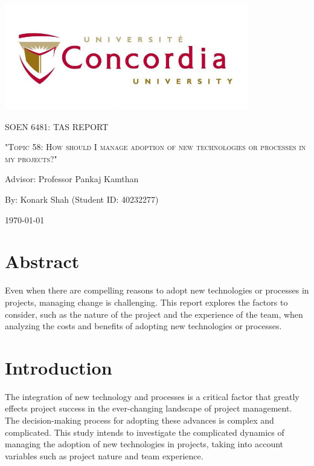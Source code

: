 \documentclass{article}
\begin{document}
\begin{titlepage}
    \centering
    \includegraphics[width=0.8\textwidth]{image.jpeg}\par %
     \vspace{2cm}
    {\scshape\Large SOEN 6481: TAS REPORT \par}
    \vspace{1.5cm}
    {\scshape\Huge "Topic 58: How should I manage adoption of new technologies or processes in my projects?"\par}
    \vspace{1.5cm}
    {\large Advisor: Professor Pankaj Kamthan\par}
    \vspace{1.5cm}
    {\large By: Konark Shah (Student ID: 40232277)\par}
    \vspace{1cm}
    {\large \today\par}
\end{titlepage}



\tableofcontents

\newpage

\section{Abstract}
Even when there are compelling reasons to adopt new technologies or processes in projects, managing change is challenging. This report explores the factors to consider, such as the nature of the project and the experience of the team, when analyzing the costs and benefits of adopting new technologies or processes.

\section{Introduction}
The integration of new technology and processes is a critical factor that greatly effects project success in the ever-changing landscape of project management. The decision-making process for adopting these advances is complex and complicated. This study intends to investigate the complicated dynamics of managing the adoption of new technologies in projects, taking into account variables such as project nature and team experience.
\end{document}
